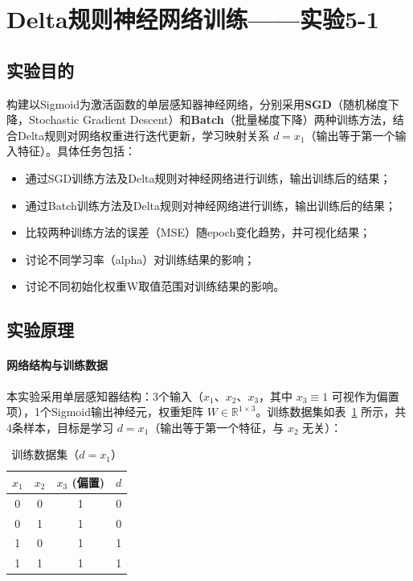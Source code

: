 \documentclass[10.5pt]{config}
\date{\today}
\begin{document}
\makeheader %

\section{Delta规则神经网络训练——实验5-1}

\subsection{实验目的}

构建以Sigmoid为激活函数的单层感知器神经网络，分别采用\textbf{SGD}（随机梯度下降，Stochastic Gradient Descent）和\textbf{Batch}（批量梯度下降）两种训练方法，结合Delta规则对网络权重进行迭代更新，学习映射关系 $d = x_1$（输出等于第一个输入特征）。具体任务包括：

\begin{itemize}
    \item 通过SGD训练方法及Delta规则对神经网络进行训练，输出训练后的结果；
    \item 通过Batch训练方法及Delta规则对神经网络进行训练，输出训练后的结果；
    \item 比较两种训练方法的误差（MSE）随epoch变化趋势，并可视化结果；
    \item 讨论不同学习率（alpha）对训练结果的影响；
    \item 讨论不同初始化权重W取值范围对训练结果的影响。
\end{itemize}

\subsection{实验原理}

\paragraph{网络结构与训练数据}

本实验采用单层感知器结构：3个输入（$x_1$、$x_2$、$x_3$，其中 $x_3 \equiv 1$ 可视作为偏置项），1个Sigmoid输出神经元，权重矩阵 $W \in \mathbb{R}^{1 \times 3}$。训练数据集如表~\ref{tab:dataset} 所示，共4条样本，目标是学习 $d = x_1$（输出等于第一个特征，与 $x_2$ 无关）：

\begin{table}[H]
\centering
\begin{tabular}{cccc}
\toprule
$x_1$ & $x_2$ & $x_3$ (偏置) & $d$ \\
\midrule
0 & 0 & 1 & 0 \\
0 & 1 & 1 & 0 \\
1 & 0 & 1 & 1 \\
1 & 1 & 1 & 1 \\
\bottomrule
\end{tabular}
\caption{训练数据集（$d = x_1$）}
\label{tab:dataset}
\end{table}
\end{document}
